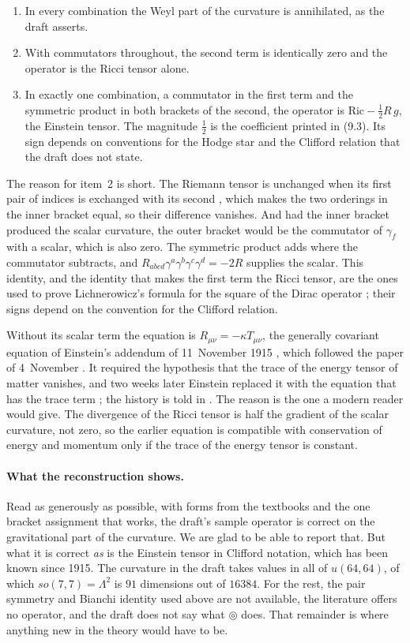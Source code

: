 \documentclass[11pt]{article}
\theoremstyle{remark}
\newcommand{\Sh}{\circledcirc}
\begin{document}
\begin{enumerate}
\item In every combination the Weyl part of the curvature is annihilated, as the draft
asserts.
\item With commutators throughout, the second term is identically zero and the operator is the
Ricci tensor alone.
\item In exactly one combination, a commutator in the first term and the symmetric product in
both brackets of the second, the operator is $\mathrm{Ric}-\tfrac12 R\,g$, the Einstein tensor.
The magnitude $\tfrac12$ is the coefficient printed in (9.3). Its sign depends on conventions
for the Hodge star and the Clifford relation that the draft does not state.
\end{enumerate}

The reason for item~2 is short. The Riemann tensor is unchanged when its first pair of indices
is exchanged with its second \cite[Section~1.G]{Besse}, which makes the two orderings in the inner bracket equal, so
their difference vanishes. And had the inner bracket produced the scalar curvature, the outer
bracket would be the commutator of $\gamma_f$ with a scalar, which is also zero. The symmetric
product adds where the commutator subtracts, and
$R_{abcd}\gamma^a\gamma^b\gamma^c\gamma^d=-2R$ supplies the scalar. This identity, and the
identity that makes the first term the Ricci tensor, are the ones used to prove
Lichnerowicz's formula for the square of the Dirac operator \cite[Chapter~II, Section~8]{LM};
their signs depend on the convention for the Clifford relation.

Without its scalar term the equation is $R_{\mu\nu}=-\kappa T_{\mu\nu}$, the generally
covariant equation of Einstein's addendum of 11~November 1915 \cite{Ein15b}, which followed the
paper of 4~November \cite{Ein15a}. It required the hypothesis that the trace of the energy
tensor of matter vanishes, and two weeks later Einstein replaced it with the equation that has
the trace term \cite{Ein15c}; the history is told in \cite{JR}. The reason is the one a modern
reader would give. The divergence of the Ricci tensor is half the gradient of the scalar
curvature, not zero, so the earlier equation is compatible with conservation of energy and
momentum only if the trace of the energy tensor is constant.

\paragraph{What the reconstruction shows.} Read as generously as possible, with forms from the
textbooks and the one bracket assignment that works, the draft's sample operator is correct on
the gravitational part of the curvature. We are glad to be able to report that. But what it is
correct \emph{as} is the Einstein tensor \cite{Ein15c} in Clifford notation, which has been
known since 1915. The curvature in the draft takes
values in all of $u(64,64)$, of which $so(7,7)=\Lambda^2$ is $91$ dimensions out of $16384$.
For the rest, the pair symmetry and Bianchi identity used above are not available, the
literature offers no operator, and the draft does not say what $\Sh$ does. That remainder is
where anything new in the theory would have to be.
\end{document}
